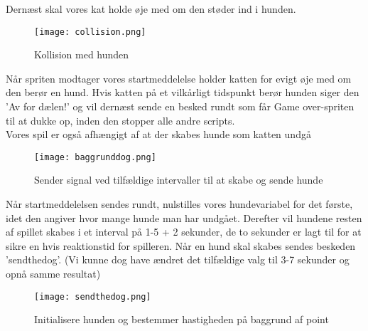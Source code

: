 Dernæst skal vores kat holde øje med om den støder ind i hunden.\\

\begin{figure}[ht]
	\centering
	\texttt{[image: collision.png]}
	\caption{{Kollision med hunden}}
	\label{fig:coll}
\end{figure}

Når spriten modtager vores startmeddelelse holder katten for evigt øje med om den berør en hund. Hvis katten på et vilkårligt tidspunkt berør hunden siger den 'Av for dælen!' og vil dernæst sende en besked rundt som får Game over-spriten til at dukke op, inden den stopper alle andre scripts.\\
\clearpage
Vores spil er også afhængigt af at der skabes hunde som katten undgå\\
\begin{figure}[ht]
	\centering
	\texttt{[image: baggrunddog.png]}
	\caption{{Sender signal ved tilfældige intervaller til at skabe og sende hunde}}
	\label{fig:dog_sig}
\end{figure}

Når startmeddelelsen sendes rundt, nulstilles vores hundevariabel for det første, idet den angiver hvor mange hunde man har undgået. Derefter vil hundene resten af spillet skabes i et interval på 1-5 + 2 sekunder, de to sekunder er lagt til for at sikre en hvis reaktionstid for spilleren. Når en hund skal skabes sendes beskeden 'sendthedog'. (Vi kunne dog have ændret det tilfældige valg til 3-7 sekunder og opnå samme resultat)\\



\begin{figure}[ht]
	\centering
	\texttt{[image: sendthedog.png]}
	\caption{{Initialisere hunden og bestemmer hastigheden på baggrund af point}}
	\label{fig:dog_init}
\end{figure}





